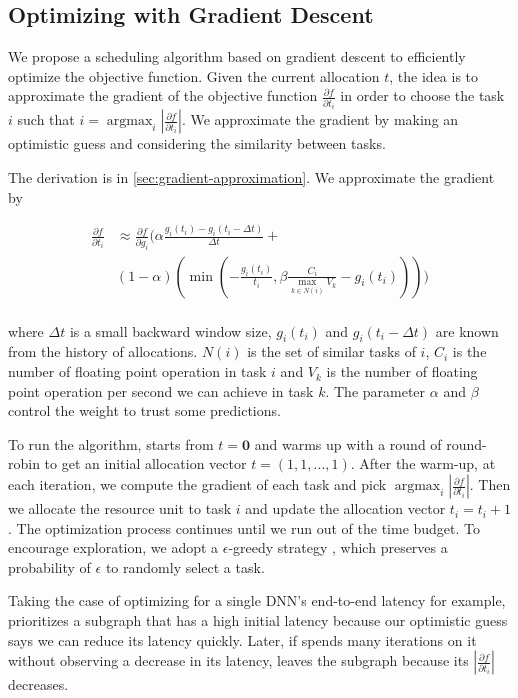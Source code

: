 \subsection{Optimizing with Gradient Descent}
\label{subsec:grdient-descent}
We propose a scheduling algorithm based on gradient descent to efficiently optimize the objective function.
Given the current allocation $t$, the idea is to approximate the gradient of the objective function $\frac{\partial f}{\partial t_i}$ in order to choose the task $i$ such that $i = \operatorname*{argmax}_i{|\frac{\partial f}{\partial t_i}|}$.
We approximate the gradient by making an optimistic guess and considering the similarity between tasks.

The derivation is in \autoref{sec:gradient-approximation}.
We approximate the gradient by 

\preeq \preeq \preeq
\begin{align*}
\frac{\partial f}{\partial t_i} 
&\approx \frac{\partial f}{\partial g_i} (\alpha \frac{g_i(t_i) - g_i(t_i - \Delta t)}{\Delta t}  
+ \\
& (1-\alpha)  (\min( - \frac{g_i(t_i)}{t_i}, \beta \frac{C_i}{\max_{k\in N(i)} {V_k}}  - g_i(t_i)))) \\
\end{align*}
\posteq \posteq \posteq \posteq

\noindent where $\Delta t$ is a small backward window size, $g_i(t_i)$ and $g_i(t_i - \Delta t)$ are known from the history of allocations. $N(i)$ is the set of similar tasks of $i$, $C_i$ is the number of floating point operation in task $i$ and $V_k$ is the number of floating point operation per second we can achieve in task $k$. 
The parameter $\alpha$ and  $\beta$ control the weight to trust some predictions.

To run the algorithm, \Ansor starts from $t = \mathbf{0}$ and warms up with a round of round-robin to get an initial allocation vector $t = (1, 1, ..., 1)$.
After the warm-up, at each iteration, we compute the gradient of each task and pick $\operatorname*{argmax}_i{|\frac{\partial f}{\partial t_i}|}$.
Then we allocate the resource unit to task $i$ and update the allocation vector $t_i = t_i + 1$.
The optimization process continues until we run out of the time budget.
To encourage exploration, we adopt a $\epsilon$-greedy strategy \cite{sutton2018reinforcement}, which preserves a probability of $\epsilon$ to randomly select a task.

Taking the case of optimizing for a single DNN's end-to-end latency for example, \Ansor prioritizes a subgraph that has a high initial latency because our optimistic guess says we can reduce its latency quickly. Later, if \Ansor spends many iterations on it without observing a decrease in its latency, \Ansor leaves the subgraph because its $|\frac{\partial f}{\partial t_i}|$ decreases.